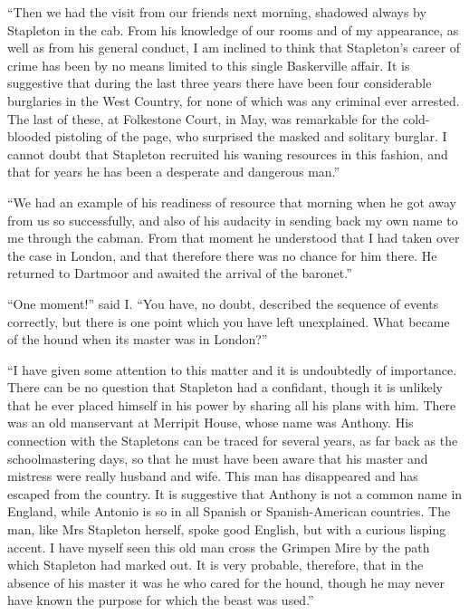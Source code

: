 \documentclass[paper=5.5in:8.5in,BCOR=7mm,twoside,DIV=calc,12pt,usegeometry,openany,chapterprefix,endperiod]{scrbook} %
\begin{document}
\enquote{Then we had the visit from our friends next morning, shadowed always by Stapleton in the cab. From his knowledge of our rooms and of my appearance, as well as from his general conduct, I am inclined to think that Stapleton's career of crime has been by no means limited to this single Baskerville affair. It is suggestive that during the last three years there have been four considerable burglaries in the West Country, for none of which was any criminal ever arrested. The last of these, at Folkestone Court, in May, was remarkable for the cold-blooded pistoling of the page, who surprised the masked and solitary burglar. I cannot doubt that Stapleton recruited his waning resources in this fashion, and that for years he has been a desperate and dangerous man.}

\enquote{We had an example of his readiness of resource that morning when he got away from us so successfully, and also of his audacity in sending back my own name to me through the cabman. From that moment he understood that I had taken over the case in London, and that therefore there was no chance for him there. He returned to Dartmoor and awaited the arrival of the baronet.}

\enquote{One moment!} said I. \enquote{You have, no doubt, described the sequence of events correctly, but there is one point which you have left unexplained. What became of the hound when its master was in London?}

\enquote{I have given some attention to this matter and it is undoubtedly of importance. There can be no question that Stapleton had a confidant, though it is unlikely that he ever placed himself in his power by sharing all his plans with him. There was an old manservant at Merripit House, whose name was Anthony. His connection with the Stapletons can be traced for several years, as far back as the schoolmastering days, so that he must have been aware that his master and mistress were really husband and wife. This man has disappeared and has escaped from the country. It is suggestive that Anthony is not a common name in England, while Antonio is so in all Spanish or Spanish-American countries. The man, like Mrs Stapleton herself, spoke good English, but with a curious lisping accent. I have myself seen this old man cross the Grimpen Mire by the path which Stapleton had marked out. It is very probable, therefore, that in the absence of his master it was he who cared for the hound, though he may never have known the purpose for which the beast was used.}
\end{document}
